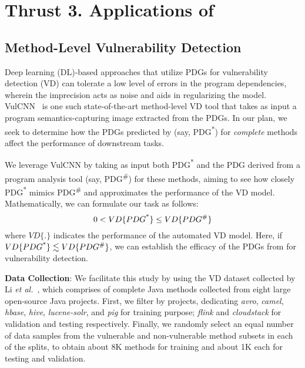 \section{Thrust 3. Applications of {\tool}}
\label{sec:thrust3}


\subsection{Method-Level Vulnerability Detection}


Deep learning (DL)-based approaches that utilize PDGs for
vulnerability detection (VD) can tolerate a low level of errors in the
program dependencies, wherein the imprecision acts as noise and aids
in regularizing the model. VulCNN~\cite{wu2022vulcnn} is one such
state-of-the-art method-level VD tool that takes as input a program
semantics-capturing image extracted from the PDGs. In our plan,
we seek to determine how the PDGs predicted by \tool (say,
PDG\textsuperscript{*}) for {\em complete} methods affect the
performance of downstream tasks.


We leverage VulCNN by taking as input both PDG\textsuperscript{*} and
the PDG derived from a program analysis tool (say,
PDG\textsuperscript{\#}) for these methods, aiming to see how closely
PDG\textsuperscript{*} mimics PDG\textsuperscript{\#} and approximates
the performance of the VD model. Mathematically, we can formulate our
task as follows:
\begin{equation}
    \centering
    0 < VD\{PDG\textsuperscript{*}\} \leq VD\{PDG\textsuperscript{\#}\}
\end{equation}
where $VD\{.\}$ indicates the performance of the automated VD model. Here, if $VD\{PDG\textsuperscript{*}\} \lesssim VD\{PDG\textsuperscript{\#}\}$, we can establish the efficacy of the PDGs from \tool for vulnerability detection.


{\bf Data Collection}: We facilitate this study by using the VD
dataset collected by Li {\em et al.}~\cite{yioopsla19}, which
comprises of
complete Java methods collected from eight large
open-source Java projects. First, we filter by projects, dedicating
\textit{avro}, \textit{camel}, \textit{hbase}, \textit{hive},
\textit{lucene-solr}, and \textit{pig} for training purpose;
\textit{flink} and \textit{cloudstack} for validation and testing
respectively.
Finally, we randomly select an equal number of data samples from the
vulnerable and non-vulnerable method subsets in each of the splits, to
obtain about 8K methods for training and about 1K each for testing and
validation.

